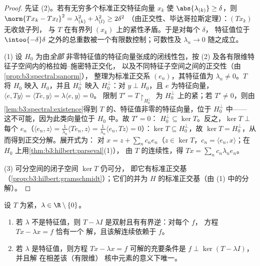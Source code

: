 \begin{proof}
先证 (2)。若有无穷多个标准正交特征向量 $x_k$
使 $\abs{\lambda_{(k)}} \geq \delta$，则 $\norm{Tx_k - Tx_l}^2 =
\lambda_{(k)}^2 + \lambda_{(l)}^2 \geq 2\delta^2$
（由正交性、毕达哥拉斯定理）：$(Tx_k)$ 无收敛子列，
与 $T$ 在有界列
$(x_k)$ 上的紧性矛盾。于是对每个 $\delta$，
特征值位于
$\intoo{-\delta}\delta$ 之外的总重数被一个有限数控制；可数性及 $\lambda_n \to 0$
随之成立。

(1) 设 $H_0$ 为由\emph{全部}
非零特征值的特征向量张成的闭线性包，按
(2) 及各有限维特征子空间内的格拉姆–施密特正交化，
以及不同特征子空间之间的正交性（由\cref{prop:b3:spectral:sanorm}），
整理为标准正交系
$(e_n)$，其特征值为 $\lambda_n \neq 0$。$T$ 将 $H_0$
映入 $H_0$，并且 $H_0^\perp$ 映入 $H_0^\perp$：对 $y
\perp H_0$，且 $e$ 为特征向量，$\langle e, Ty\rangle =
\langle Te, y\rangle = \lambda\langle e, y\rangle = 0$。
限制 $T' = T\restriction_{H_0^\perp}$ 为
$H_0^\perp$ 上的紧；若 $T' \neq
0$，则由\cref{lem:b3:spectral:existence}得到
$T$ 的、特征值非零的特征向量，位于 $H_0^\perp$ 中——
这不可能，因为此类向量位于 $H_0$ 中。故 $T' = 0$：
$H_0^\perp \subseteq \ker T$。反之，$\ker T \perp$ 每个
$e_n$（$\langle e_n, z\rangle = \frac1{\lambda_n}\langle
Te_n, z\rangle = \frac1{\lambda_n}\langle e_n, Tz\rangle =
0$）：$\ker T \subseteq H_0^\perp$，故 $\ker T =
H_0^\perp$，从而得到正交分解。展开式为：
对 $x = z + \sum_nc_ne_n$（$z \in \ker T$，$c_n = \langle
e_n, x\rangle$；在 $H_0$ 上用\cref{thm:b3:hilbert:parseval}(1)），
由 $T$ 的连续性，得 $Tx = \sum_nc_n\lambda_ne_n$。

(3) 可分空间的闭子空间 $\ker T$ 仍可分，
即它有标准正交基
（\cref{prop:b3:hilbert:gramschmidt}）；它们的并为
$H$ 的标准正交基（由 (1) 中的分解）。
\end{proof}

\begin{theorem}[弗雷德霍姆择一定理]
\label{thm:b3:spectral:fredholm}
设 $T$ 为紧，$\lambda \in \R\setminus
\{0\}$。
\begin{enumerate}
  \item 若 $\lambda$ 不是特征值，则 $T - \lambda I$
        是双射且有有界逆：对每个 $f$，
        方程 $Tx - \lambda x = f$ 恰有一个
        解，且该解连续依赖于 $f$。
  \item 若 $\lambda$ 是特征值，则方程 $Tx - \lambda x = f$
        可解的充要条件是 $f \perp \ker(T - \lambda I)$，并且解
        在相差该（有限维）
        核中元素的意义下唯一。
\end{enumerate}
\end{theorem}

